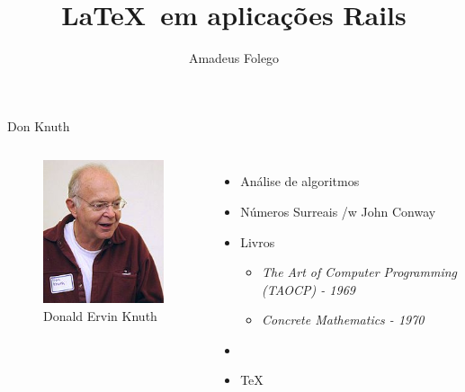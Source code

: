 \documentclass{beamer}
\author{Amadeus Folego}
\title{\LaTeX\ em aplicações Rails}
\date{}
\institute{
  \begin{tabular}{c c}
    {\em email} & \url{amadeusfolego[at]gmail[dot]com}\\
    {\em twitter/github} & \url{@amadeusfolego}\\
    {\em www} & \url{http://badosu.com}
  \end{tabular}
}
\begin{document}
  \frame[plain]{ \titlepage }
  \begin{frame}{Don Knuth}
    \begin{columns}[c]
        \begin{figure}[t]
          \includegraphics[width=\columnwidth]{192px-KnuthAtOpenContentAlliance}
          \caption*{\scriptsize Donald Ervin Knuth}
        \end{figure}
        \begin{itemize}
          \item \pause Análise de algoritmos \pause
          \item Números Surreais /w John Conway \pause
          \item Livros \pause
            \begin{itemize}
              \item {\em The Art of Computer Programming (TAOCP) - 1969} \pause
              \item {\em Concrete Mathematics - 1970} \pause
            \end{itemize}
          \item \MF\pause
          \item \TeX\
        \end{itemize}
    \end{columns}
  \end{frame}
\end{document}
